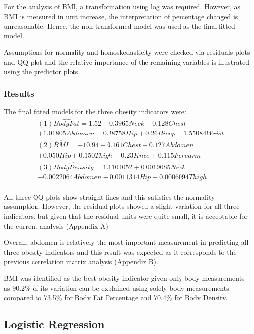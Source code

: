 \documentclass[a4paper,9pt,twocolumn,twoside,]{pinp}
\begin{document}
For the analysis of BMI, a transformation using log was required.
However, as BMI is measured in unit increase, the interpretation of
percentage changed is unreasonable. Hence, the non-transformed model was
used as the final fitted model.

Assumptions for normality and homoskedasticity were checked via
residuals plots and QQ plot and the relative importance of the remaining
variables is illustrated using the predictor plots.

\hypertarget{results}{%
\subsubsection{Results}\label{results}}

The final fitted models for the three obesity indicators were: \[ 
\begin{aligned}
&(1) \hat{Body Fat} = 1.52 -0.3965Neck - 0.128Chest\\
&+ 1.01805Abdomen -0.28758Hip + 0.26Bicep -1.55084Wrist\\
&(2) \hat{BMI} = -10.94 +0.161Chest + 0.127Abdomen\\
&+ 0.050Hip + 0.150Thigh - 0.23Knee + 0.115Forearm\\
&(3) \hat{Body Density} = 1.1104052 + 0.0019085 Neck\\
&- 0.0022064Abdomen + 0.0011314 Hip - 0.0006094 Thigh\\
\end{aligned}
\]

All three QQ plots show straight lines and this satisfies the normality
assumption. However, the residual plots showed a slight variation for
all three indicators, but given that the residual units were quite
small, it is acceptable for the current analysis (Appendix A).

Overall, abdomen is relatively the most important measurement in
predicting all three obesity indicators and this result was expected as
it corresponds to the previous correlation matrix analysis (Appendix B).

BMI was identified as the best obesity indicator given only body
measurements as 90.2\% of its variation can be explained using solely
body measurements compared to 73.5\% for Body Fat Percentage and 70.4\%
for Body Density.

\hypertarget{logistic-regression}{%
\subsection{Logistic Regression}\label{logistic-regression}}
\end{document}
